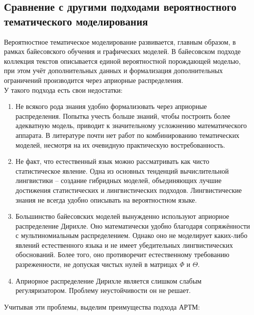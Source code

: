 \documentclass[12pt]{article}
\begin{document}
\subsection{Сравнение с другими подходами вероятностного тематического моделирования}
Вероятностное тематическое моделирование развивается, главным образом, в рамках байесовского обучения и графических моделей. В байесовском подходе коллекция текстов описывается единой вероятностной порождающей моделью, при этом учёт дополнительных данных и формализация дополнительных ограничений производится через априорные распределения.\\
У такого подхода есть свои недостатки:
\begin{enumerate}
\item Не всякого рода знания удобно формализовать через априорные распределения. Попытка учесть больше знаний, чтобы построить более адекватную модель, приводит к значительному усложнению математического аппарата. В литературе почти нет работ по комбинированию тематических моделей, несмотря на их очевидную практическую востребованность.
\item Не факт, что естественный язык можно рассматривать как чисто статистическое явление. Одна из основных тенденций вычислительной лингвистики -- создание гибридных моделей, объединяющих лучшие достижения статистических и лингвистических подходов. Лингвистические знания не всегда удобно описывать на вероятностном языке.
\item Большинство байесовских моделей вынужденно используют априорное распределение Дирихле\cite{ldadef1}. Оно математически удобно благодаря сопряжённости с мультиномиальным распределением. Однако оно не моделирует каких-либо явлений естественного языка и не имеет убедительных лингвистических обоснований. Более того, оно противоречит естественному требованию разреженности, не допуская чистых нулей в матрицах $\Phi$  и $\Theta$.
\item Априорное распределение Дирихле является слишком слабым регуляризатором. Проблему неустойчивости он не решает.
\end{enumerate}
Учитывая эти проблемы, выделим преимущества подхода АРТМ:
\end{document}
